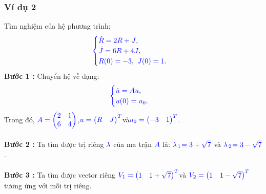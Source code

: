 \documentclass[a4paper]{article}
\begin{document}
\subsubsection{Ví dụ 2}
Tìm nghiệm của hệ phương trình:
\begin{align}
	    \textcolor{blue}{
	    \begin{cases}
            \dot R = 2R + J \textcolor{black}{,}\\
            \dot J = 6R + 4J \textcolor{black}{,}\\
            R(0) = -3\textcolor{black}{,} \enskip J(0) = 1 \textcolor{black}{.}
        \end{cases}
        }
        \label{label6}
	\end{align}
{\bfseries Bước 1 :} Chuyển hệ về dạng:
\begin{align}
	    \textcolor{blue}{
	    \begin{cases}
            \dot u = Au \textcolor{black}{,}\\
            u(0) = u\sb{0}\textcolor{black}{.}
        \end{cases}
        }
        \label{label4}
	\end{align}
Trong đó,  $\textcolor{blue}{A = \begin{pmatrix} 2 & 1\\ 6 & 4 \end{pmatrix}}$,\enskip $\textcolor{blue}{u = \begin{pmatrix} R & J \end{pmatrix}\sp{T}}$\enskip và\enskip $\textcolor{blue}{u\sb{0} = \begin{pmatrix} -3 & 1 \end{pmatrix}\sp{T}}$.\\\\
{\bfseries Bước 2 :} Ta tìm được trị riêng $\textcolor{blue}{\lambda}$ của ma trận $\textcolor{blue}{A}$ là: $\textcolor{blue}{\lambda}$$\textcolor{blue}{\sb{1}}$$\textcolor{blue}{=3+\sqrt{7}}$ và $\textcolor{blue}{\lambda}$$\textcolor{blue}{\sb{2}}$$\textcolor{blue}{=3-\sqrt{7}}$.\\\\
{\bfseries Bước 3 :} Ta tìm được vector riêng \enskip $\textcolor{blue}{V\sb{1} = \begin{pmatrix} 1 & 1+\sqrt{7} \end{pmatrix}\sp{T}}$\enskip và \enskip $\textcolor{blue}{V\sb{2} = \begin{pmatrix} 1 & 1-\sqrt{7} \end{pmatrix}\sp{T}}$\enskip tương ứng với mỗi trị riêng.\\\\
\end{document}
